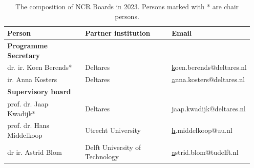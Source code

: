 \begin{longtable}{@{}lll@{}}
\caption{The composition of NCR Boards in 2023. Persons marked with * are chair persons.}\\


\rowcolor[HTML]{629194} 
{\color[HTML]{FFFFFF} \textbf{Person}} & {\color[HTML]{FFFFFF} \textbf{Partner   institution}} & {\color[HTML]{FFFFFF} \textbf{Email}}                        \\
\endhead
\rowcolor[HTML]{C9D6D6} 
\textbf{Programme Secretary}           &                                                       &                                                              \\
\rowcolor[HTML]{B9C6D5} 
dr. ir. Koen Berends*                  & Deltares                                              & {\color[HTML]{0563C1} {\ul koen.berends@deltares.nl}}        \\
\rowcolor[HTML]{C9D6D6} 
ir. Anna Kosters                       & Deltares                                              & {\color[HTML]{0563C1} {\ul anna.kosters@deltares.nl}}        \\
\rowcolor[HTML]{B9C6D5} 
\textbf{Supervisory board}             &                                                       &                                                              \\
\rowcolor[HTML]{C9D6D6} 
prof. dr. Jaap Kwadijk*                & Deltares                                              & {\color[HTML]{0563C1} {\ul jaap.kwadijk@deltares.nl}}        \\
\rowcolor[HTML]{B9C6D5} 
prof. dr. Hans Middelkoop              & Utrecht University                                    & {\color[HTML]{0563C1} {\ul h.middelkoop@uu.nl}}              \\
\rowcolor[HTML]{C9D6D6} 
dr ir. Astrid Blom                     & Delft University of   Technology                      & {\color[HTML]{0563C1} {\ul astrid.blom@tudelft.nl}}          \\

\end{longtable}
